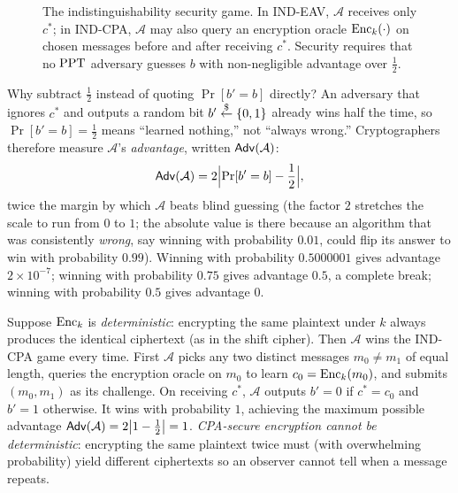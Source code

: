 \begin{figure}[htbp]
\caption{The indistinguishability security game. In IND-EAV, $\mathcal{A}$ receives only $c^*$; in IND-CPA, $\mathcal{A}$ may also query an encryption oracle $\operatorname{Enc}_k(\cdot)$ on chosen messages before and after receiving $c^*$. Security requires that no $\mathrm{PPT}$ adversary guesses $b$ with non-negligible advantage over $\tfrac{1}{2}$.}
\label{ch01:fig-ind-game}
\end{figure}

Why subtract $\frac{1}{2}$ instead of quoting $\Pr[b'=b]$ directly? An adversary that ignores $c^*$ and outputs a random bit $b' \stackrel{\$}{\gets} \{0,1\}$ already wins half the time, so $\Pr[b'=b] = \frac{1}{2}$ means ``learned nothing,'' not ``always wrong.'' Cryptographers therefore measure $\mathcal{A}$'s \emph{advantage}, written $\mathsf{Adv}(\mathcal{A})$:
\[
\mathsf{Adv}(\mathcal{A}) = 2\Bigl|\Pr[b' = b] - \frac{1}{2}\Bigr|,
\]
twice the margin by which $\mathcal{A}$ beats blind guessing (the factor $2$ stretches the scale to run from $0$ to $1$; the absolute value is there because an algorithm that was consistently \emph{wrong}, say winning with probability $0.01$, could flip its answer to win with probability $0.99$). Winning with probability $0.5000001$ gives advantage $2 \times 10^{-7}$; winning with probability $0.75$ gives advantage $0.5$, a complete break; winning with probability $0.5$ gives advantage $0$.

\begin{example}
\label{ch01:ex-deterministic}
Suppose $\operatorname{Enc}_k$ is \emph{deterministic}: encrypting the same plaintext under $k$ always produces the identical ciphertext (as in the shift cipher). Then $\mathcal{A}$ wins the IND-CPA game every time. First $\mathcal{A}$ picks any two distinct messages $m_0 \ne m_1$ of equal length, queries the encryption oracle on $m_0$ to learn $c_0 = \operatorname{Enc}_k(m_0)$, and submits $(m_0, m_1)$ as its challenge. On receiving $c^*$, $\mathcal{A}$ outputs $b' = 0$ if $c^* = c_0$ and $b' = 1$ otherwise. It wins with probability $1$, achieving the maximum possible advantage $\mathsf{Adv}(\mathcal{A}) = 2\bigl|1 - \frac{1}{2}\bigr| = 1$. \emph{CPA-secure encryption cannot be deterministic}: encrypting the same plaintext twice must (with overwhelming probability) yield different ciphertexts so an observer cannot tell when a message repeats.
\end{example}

